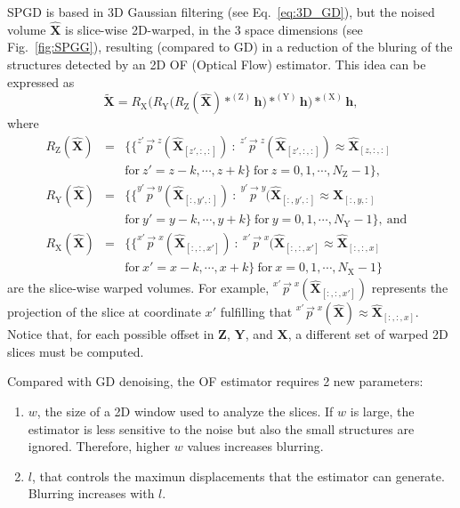 \documentclass{article}
\begin{document}
SPGD is based in 3D Gaussian filtering (see Eq.~\ref{eq:3D_GD}), but
the noised volume $\hat{\mathbf{X}}$ is slice-wise 2D-warped, in the 3
space dimensions (see Fig.~\ref{fig:SPGG}), resulting (compared
to GD) in a reduction of the bluring of the structures detected by an
2D OF (Optical Flow) estimator. This idea can be expressed as
\begin{equation}
  \tilde{\mathbf{X}}  = R_\text{X}\Big(R_\text{Y}\big(R_\text{Z}(\hat{\mathbf{X}})*^{(\text{Z})}{\mathbf h}\big)*^{(\text{Y})}{\mathbf h}\Big)*^{(\text{X})}{\mathbf h},
    \label{eq:SDPG}
\end{equation}
where
\begin{equation*}
    \begin{array}{rclll}
    R_\text{Z}(\hat{\mathbf{X}}) & = & \big\{ \{ \overset{z'\rightarrow z}p(\hat{\mathbf X}_{[z',:,:]})~:~\overset{z'\rightarrow z}p(\hat{\mathbf X}_{[z',:,:]})\approx\hat{\mathbf X}_{[z,:,:]} & \\ & & \text{for}
 ~z'=z-k,\cdots,z+k\} ~\text{for}~z=0,1,\cdots,N_\text{Z}-1\big\}, \\
    R_\text{Y}(\hat{\mathbf{X}}) & = & \big\{ \{ \overset{y'\rightarrow y}p(\hat{\mathbf X}_{[:,y',:]})~:~\overset{y'\rightarrow y}p(\hat{\mathbf X}_{[:,y',:]}\approx\hat{\mathbf X}_{[:,y,:]} & \\ & & \text{for}
 ~y'=y-k,\cdots,y+k\} ~\text{for}~y=0,1,\cdots,N_\text{Y}-1\big\},~\text{and} \\
    R_\text{X}(\hat{\mathbf{X}}) & = & \big\{ \{ \overset{x'\rightarrow x}p(\hat{\mathbf X}_{[:,:,x']})~:~\overset{x'\rightarrow x}p(\hat{\mathbf X}_{[:,:,x']}\approx\hat{\mathbf X}_{[:,:,x]} & \\ & & \text{for}
 ~x'=x-k,\cdots,x+k\} ~\text{for}~x=0,1,\cdots,N_\text{X}-1\big\}
    \end{array}
\end{equation*}
are the slice-wise warped volumes. For example,
$\overset{x'\rightarrow x}p(\hat{\mathbf X}_{[:,:,x']})$ represents
the projection of the slice at coordinate $x'$ fulfilling that
$\overset{x'\rightarrow x}p({\hat{\mathbf X}})\approx{\hat{\mathbf
    X}}_{[:,:,x]}$. Notice that, for each possible offset in
${\mathbf Z}$, ${\mathbf Y}$, and ${\mathbf X}$, a different set of
warped 2D slices must be computed.

Compared with GD denoising, the OF estimator requires 2 new
parameters:
\begin{enumerate}
\item $w$, the size of a 2D window used to analyze the slices. If $w$
  is large, the estimator is less sensitive to the noise but also the
  small structures are ignored. Therefore, higher $w$ values increases
  blurring.
\item $l$, that controls the maximun displacements that the
  estimator can generate. Blurring increases with $l$.
\end{enumerate}
\end{document}
